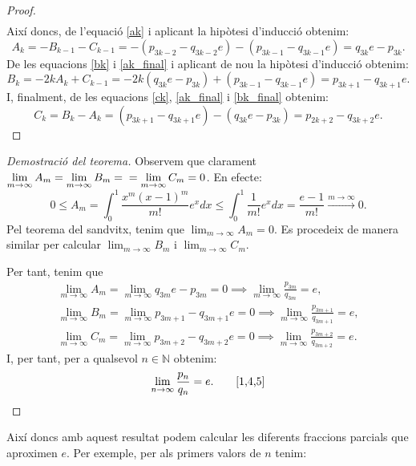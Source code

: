 \documentclass[11pt,a4paper]{article}
\theoremstyle{definition}
\begin{document}
\begin{enumerate}
\begin{proof}
\begin{multline*}
              \end{multline*}
              Així doncs, de l'equació \eqref{ak} i aplicant la hipòtesi d'inducció obtenim:
              \begin{equation}
                  A_k=-B_{k-1}-C_{k-1}=-(p_{3k-2}-q_{3k-2}e)-(p_{3k-1}-q_{3k-1}e)=q_{3k}e-p_{3k}.
                  \label{ak_final}
              \end{equation}
              De les equacions \eqref{bk} i \eqref{ak_final} i aplicant de nou la hipòtesi d'inducció obtenim:
              \begin{equation}
                  B_k=-2kA_k+C_{k-1}=-2k(q_{3k}e-p_{3k})+(p_{3k-1}-q_{3k-1}e)=p_{3k+1}-q_{3k+1}e.
                  \label{bk_final}
              \end{equation}
              I, finalment, de les equacions \eqref{ck}, \eqref{ak_final} i \eqref{bk_final} obtenim: $$C_k=B_k-A_k=(p_{3k+1}-q_{3k+1}e)-(q_{3k}e-p_{3k})=p_{2k+2}-q_{3k+2}e.$$
          \end{proof}
          \begin{proof}[Demostració del teorema]
              Observem que clarament $\displaystyle\lim_{m\to\infty} A_m=\lim_{m\to\infty} B_m=\\=\lim_{m\to\infty} C_m=0$. En efecte:
              $$0\leq A_m=\int_0^1\frac{x^m(x-1)^m}{m!}e^xdx\leq \int_0^1\frac{1}{m!}e^xdx=\frac{e-1}{m!}\xrightarrow{m\to\infty}0.$$ Pel teorema del sandvitx, tenim que $\displaystyle\lim_{m\to\infty} A_m=0$. Es procedeix de manera similar per calcular $\displaystyle\lim_{m\to\infty} B_m$ i $\displaystyle\lim_{m\to\infty} C_m$.\par
              Per tant, tenim que
              \begin{gather*}
                  \lim_{m\to\infty}A_m=\lim_{m\to\infty}q_{3m}e-p_{3m}=0\implies\lim_{m\to\infty}\frac{p_{3m}}{q_{3m}}=e,\\
                  \lim_{m\to\infty}B_m=\lim_{m\to\infty}p_{3m+1}-q_{3m+1}e=0\implies\lim_{m\to\infty}\frac{p_{3m+1}}{q_{3m+1}}=e,\\
                  \lim_{m\to\infty}C_m=\lim_{m\to\infty}p_{3m+2}-q_{3m+2}e=0\implies\lim_{m\to\infty}\frac{p_{3m+2}}{q_{3m+2}}=e.
              \end{gather*}
              I, per tant, per a qualsevol $n\in\mathbb{N}$ obtenim: $$\lim_{n\to\infty}\frac{p_n}{q_n}=e.\qquad\textnormal{\cite{1,4,5}}$$
          \end{proof}
          Així doncs amb aquest resultat podem calcular les diferents fraccions parcials que aproximen $e$. Per exemple, per als primers valors de $n$ tenim:\newpage

\end{enumerate}
\end{document}
